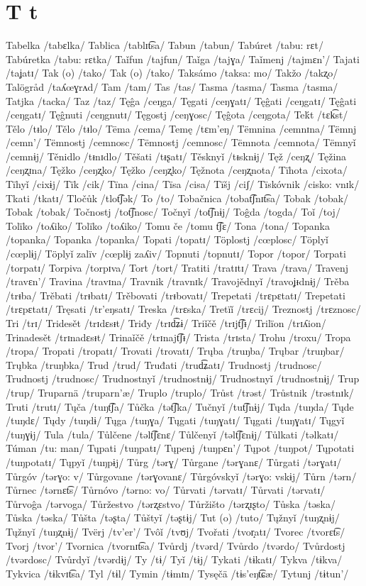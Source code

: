 \chapter{T t}

Tabelka /tabɛlka/
Tablica /tablɪt͡sa/
Tabun /tabun/
Tabúret /tabu: rɛt/
Tabúretka /tabu: rɛtka/
Taǐfun /tajfun/
Taǐga /tajɣa/
Taǐmenj /tajmɛn’/
Tajati /taʝatɪ/
Tak (o) /tako/
Tak (o) /tako/
Taksámo /taksa: mo/
Takžo /takʐo/
Talögråd /taʎœɣrʌd/
Tam /tam/
Tas /tas/
Tasma /tasma/
Tasma /tasma/
Tatjka /tacka/
Taz /taz/
Tęĝa /ceŋga/
Tęgati /ceŋɣatɪ/
Tęĝati /ceŋgatɪ/
Tęĝati /ceŋgatɪ/
Tęĝnuti /ceŋgnutɪ/
Tęgostj /ceŋɣosc/
Tęĝota /ceŋgota/
Teḱt /tɛk͡st/
Tělo /tᵻlo/
Tělo /tᵻlo/
Tëma /cema/
Temę /tɛm’eŋ/
Tëmnina /cemnɪna/
Tëmnj /cemn’/
Tëmnostj /cemnosc/
Tëmnostj /cemnosc/
Tëmnota /cemnota/
Tëmnyǐ /cemnɨj/
Těnidlo /tᵻnɪdlo/
Těšati /tᵻʂatɪ/
Těsknyǐ /tᵻsknɨj/
Tęž /ceŋʐ/
Tęžina /ceŋʐɪna/
Tęžko /ceŋʐko/
Tęžko /ceŋʐko/
Tęžnota /ceŋʐnota/
Tïhota /cixota/
Tïhyǐ /cixɨj/
Tïk /cik/
Tïna /cina/
Tïsa /cisa/
Tïšj /ciʃ/
Tïskóvnik /cisko: vnɪk/
Tkati /tkatɪ/
Tločůk /tlot͡ʃək/
To /to/
Tobačnica /tobat͡ʃnɪt͡sa/
Tobak /tobak/
Tobak /tobak/
Točnostj /tot͡ʃnosc/
Točnyǐ /tot͡ʃnɨj/
Toĝda /togda/
Toǐ /toj/
Tolïko /toʎiko/
Tolïko /toʎiko/
Tomu če /tomu t͡ʃɛ/
Tona /tona/
Topanka /topanka/
Topanka /topanka/
Topati /topatɪ/
Töplostj /cœplosc/
Töplyǐ /cœplɨj/
Töplyǐ zalïv /cœplɨj zaʎiv/
Topnuti /topnutɪ/
Topor /topor/
Torpati /torpatɪ/
Torpiva /torpɪva/
Tort /tort/
Tratiti /tratɪtɪ/
Trava /trava/
Travenj /travɛn’/
Travina /travɪna/
Travnik /travnɪk/
Travojědnyǐ /travoʝᵻdnɨj/
Trěba /trᵻba/
Trěbati /trᵻbatɪ/
Trěbovati /trᵻbovatɪ/
Trepetati /trɛpɛtatɪ/
Trepetati /trɛpɛtatɪ/
Tręsati /tr’eŋsatɪ/
Treska /trɛska/
Tretïǐ /trɛcij/
Treznostj /trɛznosc/
Tri /trɪ/
Tridesět /trɪdɛsᵻt/
Triđy /trɪd͡ʑɨ/
Triǐčě /trɪjt͡ʃᵻ/
Trilïon /trɪʎion/
Trinadesět /trɪnadɛsᵻt/
Trinaǐčě /trɪnajt͡ʃᵻ/
Trista /trɪsta/
Trohu /troxu/
Tropa /tropa/
Tropati /tropatɪ/
Trovati /trovatɪ/
Trųba /truŋba/
Trųbar /truŋbar/
Trųbka /truŋbka/
Trud /trud/
Truđati /trud͡ʑatɪ/
Trudnostj /trudnosc/
Trudnostj /trudnosc/
Trudnostnyǐ /trudnostnɨj/
Trudnostnyǐ /trudnostnɨj/
Trup /trup/
Truparnä /truparn’æ/
Truplo /truplo/
Trůst /trəst/
Trůstnik /trəstnɪk/
Truti /trutɪ/
Tųča /tuŋt͡ʃa/
Tůčka /tət͡ʃka/
Tučnyǐ /tut͡ʃnɨj/
Tųda /tuŋda/
Tųde /tuŋdɛ/
Tųdy /tuŋdɨ/
Tųga /tuŋɣa/
Tųgati /tuŋɣatɪ/
Tųgati /tuŋɣatɪ/
Tųgyǐ /tuŋɣɨj/
Tula /tula/
Tůlčene /təlt͡ʃɛnɛ/
Tůlčenyǐ /təlt͡ʃɛnɨj/
Tůlkati /təlkatɪ/
Túman /tu: man/
Tųpati /tuŋpatɪ/
Tųpenj /tuŋpɛn’/
Tųpot /tuŋpot/
Tųpotati /tuŋpotatɪ/
Tųpyǐ /tuŋpɨj/
Tůrg /tərɣ/
Tůrgane /tərɣanɛ/
Tůrgati /tərɣatɪ/
Tůrgóv /tərɣo: v/
Tůrgovane /tərɣovanɛ/
Tůrgóvskyǐ /tərɣo: vskɨj/
Tůrn /tərn/
Tůrnec /tərnɛt͡s/
Tůrnóvo /tərno: vo/
Tůrvati /tərvatɪ/
Tůrvati /tərvatɪ/
Tůrvoĝa /tərvoga/
Tůržestvo /tərʐɛstvo/
Tůržišto /tərʐɪʂto/
Tůska /təska/
Tůska /təska/
Tůšta /təʂta/
Tůštyǐ /təʂtɨj/
Tut (o) /tuto/
Tųžnyǐ /tuŋʐnɨj/
Tųžnyǐ /tuŋʐnɨj/
Tvërj /tv’er’/
Tvôǐ /tvʊj/
Tvořati /tvor̝atɪ/
Tvorec /tvorɛt͡s/
Tvorj /tvor’/
Tvornica /tvornɪt͡sa/
Tvůrdj /tvərd/
Tvůrdo /tvərdo/
Tvůrdostj /tvərdosc/
Tvůrdyǐ /tvərdɨj/
Ty /tɨ/
Tyǐ /tɨj/
Tykati /tɨkatɪ/
Tykva /tɨkva/
Tykvica /tɨkvɪt͡sa/
Tyl /tɨl/
Tymin /tɨmɪn/
Tysęčä /tɨs’eŋt͡ɕæ/
Tytunj /tɨtun’/